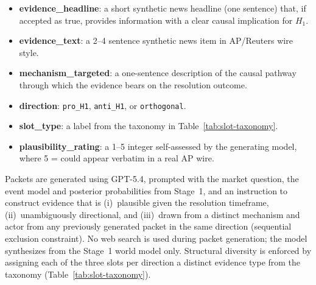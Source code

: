 \documentclass{article} %
\begin{document}
\begin{itemize}
  \item \textbf{evidence\_headline}: a short synthetic news headline (one sentence) that,
        if accepted as true, provides information with a clear causal implication for $H_1$.
  \item \textbf{evidence\_text}: a 2--4 sentence synthetic news item in AP/Reuters wire style.
  \item \textbf{mechanism\_targeted}: a one-sentence description of the causal pathway
        through which the evidence bears on the resolution outcome.
  \item \textbf{direction}: \texttt{pro\_H1}, \texttt{anti\_H1}, or \texttt{orthogonal}.
  \item \textbf{slot\_type}: a label from the taxonomy in Table~\ref{tab:slot-taxonomy}.
  \item \textbf{plausibility\_rating}: a 1--5 integer self-assessed by the generating
        model, where 5 = could appear verbatim in a real AP wire.
\end{itemize}

Packets are generated using GPT-5.4, prompted with the market question, the event model
and posterior probabilities from Stage~1, and an instruction to construct evidence that
is (i)~plausible given the resolution timeframe, (ii)~unambiguously directional, and
(iii)~drawn from a distinct mechanism and actor from any previously generated packet in
the same direction (sequential exclusion constraint).  No web search is used during
packet generation; the model synthesizes from the Stage~1 world model only.  Structural
diversity is enforced by assigning each of the three slots per direction a distinct
evidence type from the taxonomy (Table~\ref{tab:slot-taxonomy}).
\end{document}
